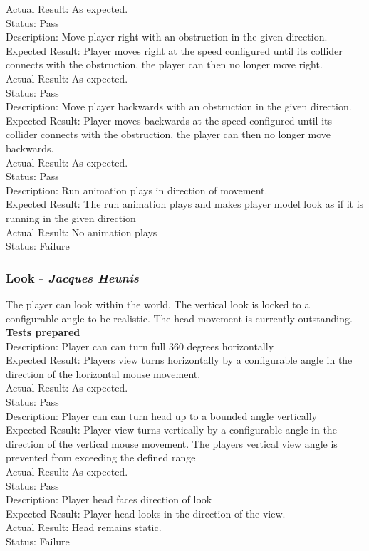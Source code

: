 \documentclass[a4paper,10pt]{article}
\begin{document}
Actual Result: As expected.\\
Status: Pass
\smallskip\\
Description: Move player right with an obstruction in the given direction.\\
Expected Result: Player moves right at the speed configured until its collider connects with the obstruction, the player can then no longer move right.\\
Actual Result: As expected.\\
Status: Pass
\smallskip\\
Description: Move player backwards with an obstruction in the given direction.\\
Expected Result: Player moves backwards at the speed configured until its collider connects with the obstruction, the player can then no longer move backwards.\\
Actual Result: As expected.\\
Status: Pass
\smallskip\\
Description: Run animation plays in direction of movement.\\
Expected Result: The run animation plays and makes player model look as if it is running in the given direction\\
Actual Result: No animation plays\\
Status: Failure
\subsubsection{Look - \textit{Jacques Heunis}}
The player can look within the world. The vertical look is locked to a configurable angle to be realistic. The head movement is currently outstanding.
\smallskip\\\textbf{Tests prepared}\\
Description: Player can can turn full 360 degrees horizontally\\
Expected Result: Players view turns horizontally by a configurable angle in the direction of the horizontal mouse movement.\\
Actual Result: As expected.\\
Status: Pass
\smallskip\\
Description: Player can can turn head up to a bounded angle vertically\\
Expected Result: Player view turns vertically by a configurable angle in the direction of the vertical mouse movement. The players vertical view angle is prevented from exceeding the defined range\\
Actual Result: As expected.\\
Status: Pass
\smallskip\\
Description: Player head faces direction of look\\
Expected Result: Player head looks in the direction of the view.\\
Actual Result:  Head remains static.\\
Status: Failure
\end{document}

